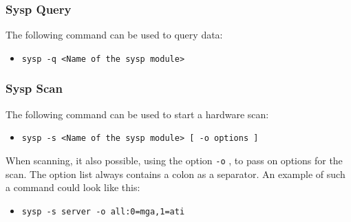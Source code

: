 \subsubsection{Sysp Query}
The following command can be used to query data:
\begin{itemize}
\item \verb+sysp -q <Name of the sysp module>+
\end{itemize}

\subsubsection{Sysp Scan}
The following command can be used to start a hardware scan:
\begin{itemize}
\item \verb+sysp -s <Name of the sysp module> [ -o options ]+ 
\end{itemize}
When scanning, it also possible, using the option \verb+-o+ , to pass on
options for the scan. The option list always contains a colon as a separator. 
An example of such a command could look like this:
\begin{itemize}
\item \verb+sysp -s server -o all:0=mga,1=ati+
\end{itemize}



